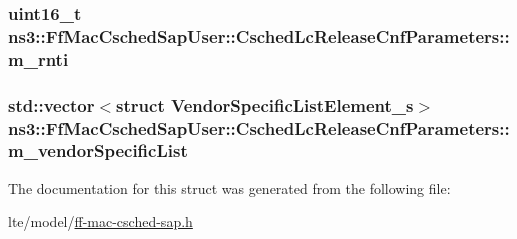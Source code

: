 \subsubsection[{\texorpdfstring{m\+\_\+rnti}{m_rnti}}]{\setlength{\rightskip}{0pt plus 5cm}uint16\+\_\+t ns3\+::\+Ff\+Mac\+Csched\+Sap\+User\+::\+Csched\+Lc\+Release\+Cnf\+Parameters\+::m\+\_\+rnti}\hypertarget{structns3_1_1FfMacCschedSapUser_1_1CschedLcReleaseCnfParameters_a2148d9d37bfe7e72f061b69f5b9aaf2b}{}\label{structns3_1_1FfMacCschedSapUser_1_1CschedLcReleaseCnfParameters_a2148d9d37bfe7e72f061b69f5b9aaf2b}
\subsubsection[{\texorpdfstring{m\+\_\+vendor\+Specific\+List}{m_vendorSpecificList}}]{\setlength{\rightskip}{0pt plus 5cm}std\+::vector$<$struct {\bf Vendor\+Specific\+List\+Element\+\_\+s}$>$ ns3\+::\+Ff\+Mac\+Csched\+Sap\+User\+::\+Csched\+Lc\+Release\+Cnf\+Parameters\+::m\+\_\+vendor\+Specific\+List}\hypertarget{structns3_1_1FfMacCschedSapUser_1_1CschedLcReleaseCnfParameters_ad8af73663bf2402110dc943df1a40aa8}{}\label{structns3_1_1FfMacCschedSapUser_1_1CschedLcReleaseCnfParameters_ad8af73663bf2402110dc943df1a40aa8}


The documentation for this struct was generated from the following file\+:\begin{DoxyCompactItemize}
\item 
lte/model/\hyperlink{ff-mac-csched-sap_8h}{ff-\/mac-\/csched-\/sap.\+h}\end{DoxyCompactItemize}
